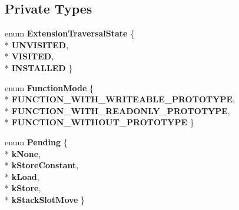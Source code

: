 \subsection*{Private Types}
\begin{DoxyCompactItemize}
\item 
enum {\bfseries Extension\+Traversal\+State} \{ \\*
{\bfseries U\+N\+V\+I\+S\+I\+T\+ED}, 
\\*
{\bfseries V\+I\+S\+I\+T\+ED}, 
\\*
{\bfseries I\+N\+S\+T\+A\+L\+L\+ED}
 \}\hypertarget{classv8_1_1internal_1_1_b_a_s_e___e_m_b_e_d_d_e_d_aff04ef8349c710eb86b4edb3de302765}{}\label{classv8_1_1internal_1_1_b_a_s_e___e_m_b_e_d_d_e_d_aff04ef8349c710eb86b4edb3de302765}

\item 
enum {\bfseries Function\+Mode} \{ \\*
{\bfseries F\+U\+N\+C\+T\+I\+O\+N\+\_\+\+W\+I\+T\+H\+\_\+\+W\+R\+I\+T\+E\+A\+B\+L\+E\+\_\+\+P\+R\+O\+T\+O\+T\+Y\+PE}, 
\\*
{\bfseries F\+U\+N\+C\+T\+I\+O\+N\+\_\+\+W\+I\+T\+H\+\_\+\+R\+E\+A\+D\+O\+N\+L\+Y\+\_\+\+P\+R\+O\+T\+O\+T\+Y\+PE}, 
\\*
{\bfseries F\+U\+N\+C\+T\+I\+O\+N\+\_\+\+W\+I\+T\+H\+O\+U\+T\+\_\+\+P\+R\+O\+T\+O\+T\+Y\+PE}
 \}\hypertarget{classv8_1_1internal_1_1_b_a_s_e___e_m_b_e_d_d_e_d_a94d227f920ec8067034e5bbca3009f47}{}\label{classv8_1_1internal_1_1_b_a_s_e___e_m_b_e_d_d_e_d_a94d227f920ec8067034e5bbca3009f47}

\item 
enum {\bfseries Pending} \{ \\*
{\bfseries k\+None}, 
\\*
{\bfseries k\+Store\+Constant}, 
\\*
{\bfseries k\+Load}, 
\\*
{\bfseries k\+Store}, 
\\*
{\bfseries k\+Stack\+Slot\+Move}
 \}\hypertarget{classv8_1_1internal_1_1_b_a_s_e___e_m_b_e_d_d_e_d_ae6c9798b9f78b20598abe6860a41def6}{}\label{classv8_1_1internal_1_1_b_a_s_e___e_m_b_e_d_d_e_d_ae6c9798b9f78b20598abe6860a41def6}


\end{DoxyCompactItemize}

